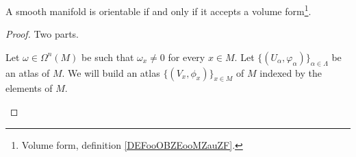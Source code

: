 \begin{theorem}	\label{THOooQEFUooQTtPDD}
	A smooth manifold is orientable if and only if it accepts a volume form\footnote{Volume form, definition \ref{DEFooOBZEooMZauZF}.}.
\end{theorem}

\begin{proof}
	Two parts.
	\begin{subproof}
		\spitem[\( \Leftarrow\)]
		Let \( \omega\in\Omega^n(M)\) be such that \( \omega_x\neq 0\) for every \( x\in M\). Let \( \{ (U_{\alpha},\varphi_{\alpha}) \}_{\alpha\in \Lambda}\) be an atlas of \( M\). We will build an atlas \( \{ (V_x,\phi_x) \}_{x\in M}\) of \( M\) indexed by the elements of \( M\).


\end{subproof}
\end{proof}
